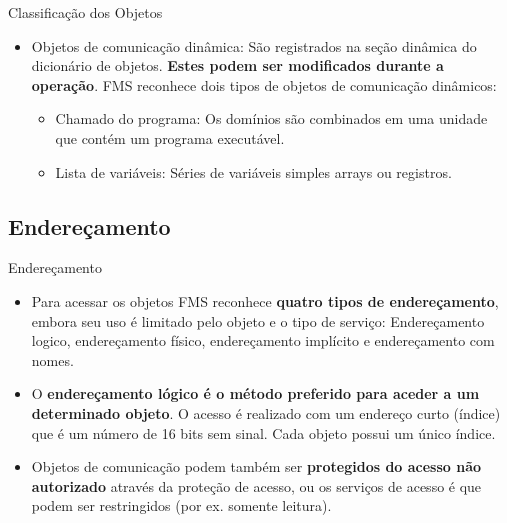 \documentclass{beamer}
\begin{document}
\begin{frame}{Classificação dos Objetos}
\begin{itemize}
\item Objetos de comunicação dinâmica: São registrados na seção dinâmica do dicionário de objetos. \textbf{Estes podem ser modificados durante a operação}. FMS reconhece dois tipos de objetos de comunicação dinâmicos:
\begin{itemize}
\item Chamado do programa: Os domínios são combinados em uma unidade que contém um programa executável. 

\item Lista de variáveis: Séries de variáveis simples arrays ou registros.
\end{itemize}
\end{itemize}
\end{frame}

\subsection{Endereçamento}
\begin{frame}{Endereçamento}
\begin{itemize}
\item Para acessar os objetos FMS reconhece \textbf{quatro tipos de endereçamento}, embora seu uso é limitado pelo objeto e o tipo de serviço: Endereçamento logico, endereçamento físico, endereçamento implícito e endereçamento com nomes.

\item O \textbf{endereçamento lógico é o método preferido para aceder a um determinado objeto}. O acesso é realizado com um endereço curto (índice) que é um número de 16 bits sem sinal. Cada objeto possui um único índice.

\item Objetos de comunicação podem também ser \textbf{protegidos do acesso não autorizado} através da proteção de acesso, ou os serviços de acesso é que podem ser restringidos (por ex. somente leitura).
\end{itemize}
\end{frame}
\end{document}
